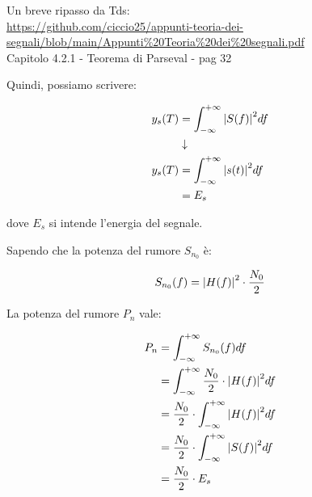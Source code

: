 \begin{tcolorbox}
      Un breve ripasso da Tds: \\
    \url{https://github.com/ciccio25/appunti-teoria-dei-segnali/blob/main/Appunti%20Teoria%20dei%20segnali.pdf} \\
    Capitolo 4.2.1 - Teorema di Parseval - pag 32
\end{tcolorbox}

Quindi, possiamo scrivere: 

{
    \Large 
    \begin{equation}
        \begin{split}
            y_s (T)
            &=
            \int_{- \infty}^{+ \infty}
            \abs{S(f)}^{2}  df
            \\
            &\downarrow
            \\
            y_s (T)
            &=
            \int_{- \infty}^{+ \infty}
            \abs{s(t)}^{2}  df
            \\
            &= 
            E_s
        \end{split}
    \end{equation}
}

dove $E_s$ si intende l'energia del segnale. \newline 

Sapendo che la potenza del rumore $S_{n_0}$ è:

{
    \Large 
    \begin{equation}
       S_{n_0} (f) = \abs{H (f)}^{2} \cdot \frac{N_0}{2} 
    \end{equation}
}

La potenza del rumore $P_n$ vale: 

{
    \Large 
    \begin{equation}
        \begin{split}
            P_n 
            &= 
            \int_{- \infty}^{+ \infty}
            S_{n_0} (f) df
            \\
            &= 
            \int_{- \infty}^{+ \infty}
            \frac{N_0}{2} \cdot \abs{H(f)}^{2}
            df
            \\
            &= 
            \frac{N_0}{2} \cdot
            \int_{- \infty}^{+ \infty}
            \abs{H(f)}^{2}
            df
            \\
            &=
            \frac{N_0}{2} \cdot
            \int_{- \infty}^{+ \infty}
            \abs{S(f)}^{2}
            df 
            \\
            &= 
            \frac{N_0}{2} \cdot E_s
        \end{split}
    \end{equation}
}

